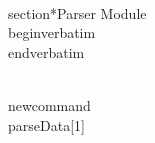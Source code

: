 \\section*{Parser Module}
\\begin{verbatim}
% Parser Module for TeX Data Processing
% This module handles the parsing of input data.
% It assumes data is provided in a structured format, such as comma-separated values.
% Example input format:
% Field1,Field2,Field3
% Value1,Value2,Value3
% ...
\\end{verbatim}

\\newcommand{\\parseData}[1]{
}
